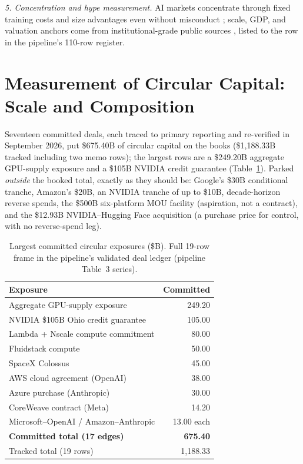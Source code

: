\documentclass[11pt,a4paper]{article}
\begin{document}
\emph{5. Concentration and hype measurement.} AI markets concentrate through
fixed training costs and size advantages even without misconduct
\citep{korinek2025}; scale, GDP, and valuation anchors come from
institutional-grade public sources \citep{iea2026, idc2026, pwc2026,
bea2026, cbo2022, damodaran2026}, listed to the row in the pipeline's
110-row register.

\section{Measurement of Circular Capital: Scale and Composition}\label{sec:capital}
Seventeen committed deals, each traced to primary reporting and re-verified
in September 2026, put \$675.40B of circular capital on the books
(\$1,188.33B tracked including two memo rows); the largest rows are a
\$249.20B aggregate GPU-supply exposure and a \$105B NVIDIA credit
guarantee (Table~\ref{tab:01-largest-committed-circular-exposures}).
Parked \emph{outside} the booked total, exactly as they should be:
Google's \$30B conditional tranche, Amazon's \$20B, an NVIDIA tranche of up
to \$10B, decade-horizon reverse spends, the
\$500B six-platform MOU facility (aspiration, not a contract), and the
\$12.93B NVIDIA--Hugging Face acquisition (a purchase price for control,
with no reverse-spend leg).

\begin{table}[htbp]
\centering
\caption{Largest committed circular exposures (\$B). Full 19-row frame in the pipeline's validated deal ledger (pipeline Table~3 series).}
    \label{tab:01-largest-committed-circular-exposures}
\begin{tabular}{lr}
\toprule
Exposure & Committed \\
\midrule
Aggregate GPU-supply exposure & 249.20 \\
NVIDIA \$105B Ohio credit guarantee & 105.00 \\
Lambda + Nscale compute commitment & 80.00 \\
Fluidstack compute & 50.00 \\
SpaceX Colossus & 45.00 \\
AWS cloud agreement (OpenAI) & 38.00 \\
Azure purchase (Anthropic) & 30.00 \\
CoreWeave contract (Meta) & 14.20 \\
Microsoft--OpenAI / Amazon--Anthropic & 13.00 each \\
\midrule
\textbf{Committed total (17 edges)} & \textbf{675.40} \\
Tracked total (19 rows) & 1,188.33 \\
\bottomrule
\end{tabular}
\end{table}
\end{document}
